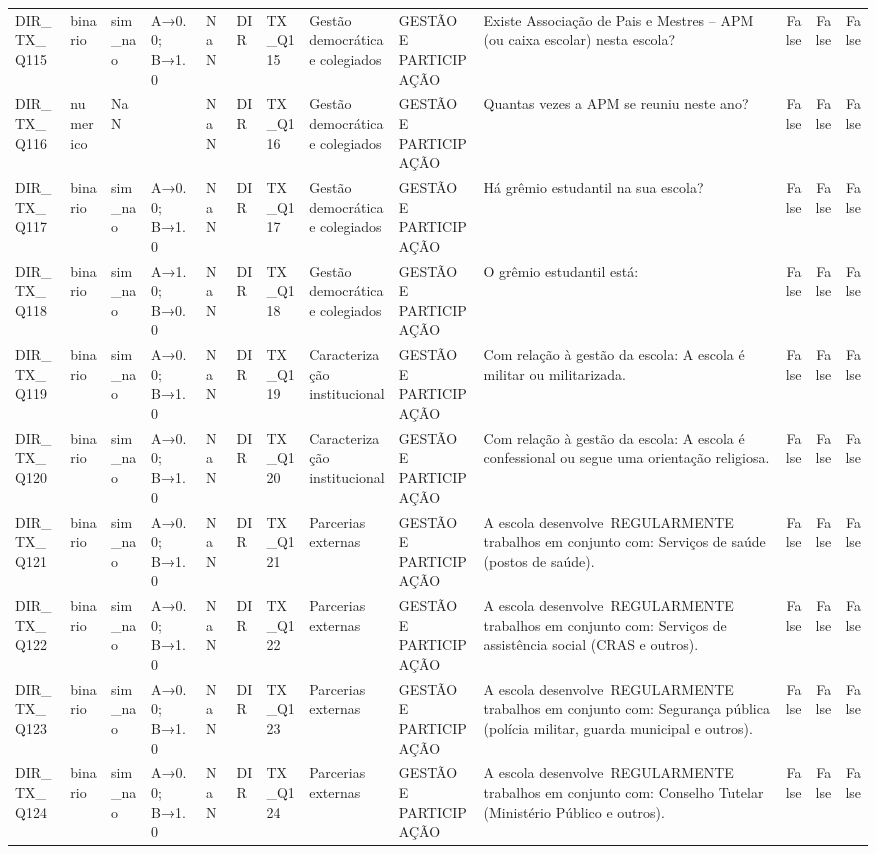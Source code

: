 \begin{tabular}{llllllllllrrr}
DIR\_TX\_Q115 & binario & sim\_nao & A→0.0; B→1.0 & NaN & DIR & TX\_Q115 & Gestão democrática e colegiados & GESTÃO E PARTICIPAÇÃO & Existe Associação de Pais e Mestres – APM (ou caixa escolar) nesta escola? & False & False & False \\
DIR\_TX\_Q116 & numerico & NaN &  & NaN & DIR & TX\_Q116 & Gestão democrática e colegiados & GESTÃO E PARTICIPAÇÃO & Quantas vezes a APM se reuniu neste ano? & False & False & False \\
DIR\_TX\_Q117 & binario & sim\_nao & A→0.0; B→1.0 & NaN & DIR & TX\_Q117 & Gestão democrática e colegiados & GESTÃO E PARTICIPAÇÃO & Há grêmio estudantil na sua escola? & False & False & False \\
DIR\_TX\_Q118 & binario & sim\_nao & A→1.0; B→0.0 & NaN & DIR & TX\_Q118 & Gestão democrática e colegiados & GESTÃO E PARTICIPAÇÃO & O grêmio estudantil está: & False & False & False \\
DIR\_TX\_Q119 & binario & sim\_nao & A→0.0; B→1.0 & NaN & DIR & TX\_Q119 & Caracterização institucional & GESTÃO E PARTICIPAÇÃO & Com relação à gestão da escola: A escola é militar ou militarizada. & False & False & False \\
DIR\_TX\_Q120 & binario & sim\_nao & A→0.0; B→1.0 & NaN & DIR & TX\_Q120 & Caracterização institucional & GESTÃO E PARTICIPAÇÃO & Com relação à gestão da escola: A escola é confessional ou segue uma orientação religiosa. & False & False & False \\
DIR\_TX\_Q121 & binario & sim\_nao & A→0.0; B→1.0 & NaN & DIR & TX\_Q121 & Parcerias externas & GESTÃO E PARTICIPAÇÃO & A escola desenvolve REGULARMENTE trabalhos em conjunto com: Serviços de saúde (postos de saúde). & False & False & False \\
DIR\_TX\_Q122 & binario & sim\_nao & A→0.0; B→1.0 & NaN & DIR & TX\_Q122 & Parcerias externas & GESTÃO E PARTICIPAÇÃO & A escola desenvolve REGULARMENTE trabalhos em conjunto com: Serviços de assistência social (CRAS e outros). & False & False & False \\
DIR\_TX\_Q123 & binario & sim\_nao & A→0.0; B→1.0 & NaN & DIR & TX\_Q123 & Parcerias externas & GESTÃO E PARTICIPAÇÃO & A escola desenvolve REGULARMENTE trabalhos em conjunto com: Segurança pública (polícia militar, guarda municipal e outros). & False & False & False \\
DIR\_TX\_Q124 & binario & sim\_nao & A→0.0; B→1.0 & NaN & DIR & TX\_Q124 & Parcerias externas & GESTÃO E PARTICIPAÇÃO & A escola desenvolve REGULARMENTE trabalhos em conjunto com: Conselho Tutelar (Ministério Público e outros). & False & False & False \\

\end{tabular}
